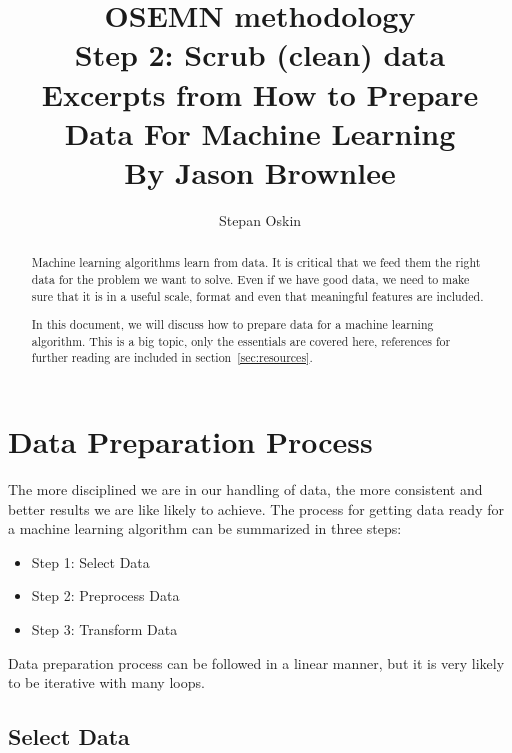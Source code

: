 \documentclass[11pt]{article}
\begin{document}
    \title{OSEMN methodology \\
    Step 2: Scrub (clean) data \\
    Excerpts from How to Prepare Data For Machine Learning \\
    By Jason Brownlee\cite{Brownlee2013} }

    \author{Stepan Oskin}

    \maketitle

    \begin{abstract}
        Machine learning algorithms learn from data.
        It is critical that we feed them the right data for the problem we want to solve.
        Even if we have good data, we need to make sure that it is in a useful scale, format and even that meaningful features are included.

        In this document, we will discuss how to prepare data for a machine learning algorithm.
        This is a big topic, only the essentials are covered here, references for further reading are included in section~\ref{sec:resources}.
    \end{abstract}

    \section{Data Preparation Process} \label{sec:data_prep}

    The more disciplined we are in our handling of data, the more consistent and better results we are like likely to achieve.
    The process for getting data ready for a machine learning algorithm can be summarized in three steps:

    \begin{itemize}
        \item Step 1: Select Data
        \item Step 2: Preprocess Data
        \item Step 3: Transform Data
    \end{itemize}

    Data preparation process can be followed in a linear manner, but it is very likely to be iterative with many loops.

    \subsection{Select Data} \label{subsec:sel_data}
\end{document}

